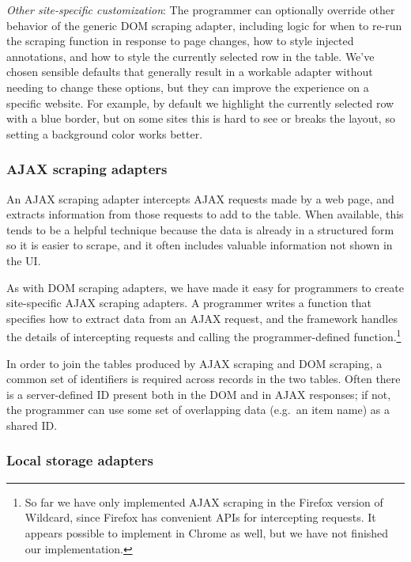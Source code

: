 \documentclass[sigplan,screen,10pt,anonymous,review]{acmart}
\begin{document}
\emph{Other site-specific customization}: The programmer can optionally
override other behavior of the generic DOM scraping adapter, including
logic for when to re-run the scraping function in response to page
changes, how to style injected annotations, and how to style the
currently selected row in the table. We've chosen sensible defaults that
generally result in a workable adapter without needing to change these
options, but they can improve the experience on a specific website. For
example, by default we highlight the currently selected row with a blue
border, but on some sites this is hard to see or breaks the layout, so
setting a background color works better.

\hypertarget{ajax-scraping-adapters}{%
\subsubsection{AJAX scraping adapters}\label{ajax-scraping-adapters}}

An AJAX scraping adapter intercepts AJAX requests made by a web page,
and extracts information from those requests to add to the table. When
available, this tends to be a helpful technique because the data is
already in a structured form so it is easier to scrape, and it often
includes valuable information not shown in the UI.

As with DOM scraping adapters, we have made it easy for programmers to
create site-specific AJAX scraping adapters. A programmer writes a
function that specifies how to extract data from an AJAX request, and
the framework handles the details of intercepting requests and calling
the programmer-defined function.\footnote{So far we have only
  implemented AJAX scraping in the Firefox version of Wildcard, since
  Firefox has convenient APIs for intercepting requests. It appears
  possible to implement in Chrome as well, but we have not finished our
  implementation.}

In order to join the tables produced by AJAX scraping and DOM scraping,
a common set of identifiers is required across records in the two
tables. Often there is a server-defined ID present both in the DOM and
in AJAX responses; if not, the programmer can use some set of
overlapping data (e.g.~an item name) as a shared ID.

\hypertarget{local-storage-adapters}{%
\subsubsection{Local storage adapters}\label{local-storage-adapters}}
\end{document}
